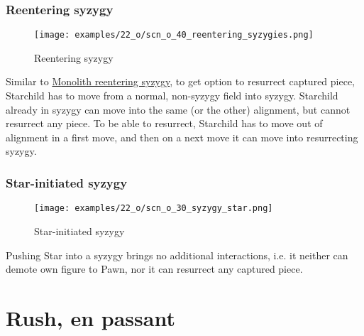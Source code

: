 \clearpage %

\subsubsection*{Reentering syzygy}

\vspace*{-1.2\baselineskip}
\noindent
\begin{figure}[!h]
\texttt{[image: examples/22\_o/scn\_o\_40\_reentering\_syzygies.png]}
\caption{Reentering syzygy}
\label{fig:scn_o_40_reentering_syzygies}
\end{figure}

Similar to
\hyperref[fig:scn_d_23_syzygy_reentering_same_move]{Monolith reentering syzygy},
to get option to resurrect captured piece, Starchild has to move from a normal,
non-syzygy field into syzygy. Starchild already in syzygy can move into the same
(or the other) alignment, but cannot resurrect any piece. To be able to resurrect,
Starchild has to move out of alignment in a first move, and then on a next move
it can move into resurrecting syzygy.

\clearpage %

\subsubsection*{Star-initiated syzygy}

\vspace*{-1.2\baselineskip}
\noindent
\begin{figure}[!h]
\texttt{[image: examples/22\_o/scn\_o\_30\_syzygy\_star.png]}
\caption{Star-initiated syzygy}
\label{fig:scn_o_30_syzygy_star}
\end{figure}

Pushing Star into a syzygy brings no additional interactions, i.e. it neither can
demote own figure to Pawn, nor it can resurrect any captured piece.

\clearpage %

\section*{Rush, en passant}

